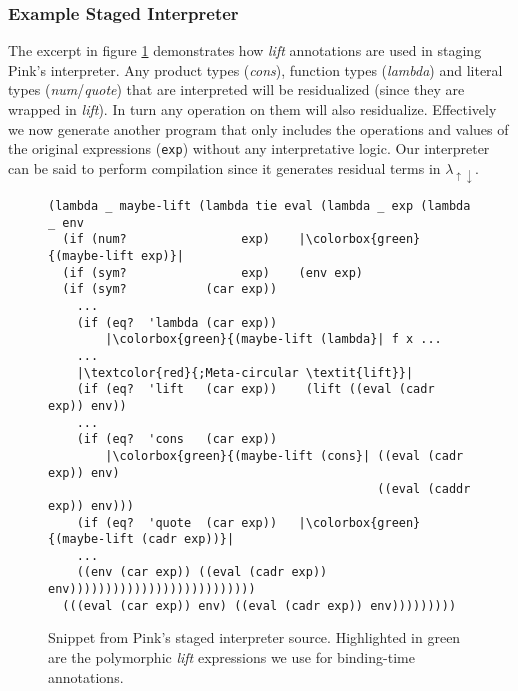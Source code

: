\documentclass[a4paper,12pt,twoside,openright]{report}
\theoremstyle{definition}
\newcommand{\mslang}{$\lambda_{\uparrow\downarrow}$}
\begin{document}
\subsubsection{Example Staged Interpreter}
The excerpt in figure \ref{fig:pink_source} demonstrates how \textit{lift} annotations are used in staging Pink's interpreter. Any product types (\textit{cons}), function types (\textit{lambda}) and literal types (\textit{num}/\textit{quote}) that are interpreted will be residualized (since they are wrapped in \textit{lift}). In turn any operation on them will also residualize. Effectively we now generate another program that only includes the operations and values of the original expressions (\texttt{exp}) without any interpretative logic. Our interpreter can be said to perform compilation since it generates residual terms in \mslang.

\begin{figure}[ht!]
\begin{verbatim}
(lambda _ maybe-lift (lambda tie eval (lambda _ exp (lambda _ env
  (if (num?                exp)    |\colorbox{green}{(maybe-lift exp)}|
  (if (sym?                exp)    (env exp)
  (if (sym?           (car exp))
    ...
    (if (eq?  'lambda (car exp))
        |\colorbox{green}{(maybe-lift (lambda}| f x ...
    ...
    |\textcolor{red}{;Meta-circular \textit{lift}}|
    (if (eq?  'lift   (car exp))    (lift ((eval (cadr exp)) env))
    ...
    (if (eq?  'cons   (car exp))
        |\colorbox{green}{(maybe-lift (cons}| ((eval (cadr exp)) env)
                                              ((eval (caddr exp)) env)))
    (if (eq?  'quote  (car exp))   |\colorbox{green}{(maybe-lift (cadr exp))}|
    ...
    ((env (car exp)) ((eval (cadr exp)) env))))))))))))))))))))))))))
  (((eval (car exp)) env) ((eval (cadr exp)) env)))))))))
\end{verbatim}
\caption{Snippet from Pink's staged interpreter source. Highlighted in green are the polymorphic \textit{lift} expressions we use for binding-time annotations.}
\label{fig:pink_source}
\end{figure}
\end{document}
